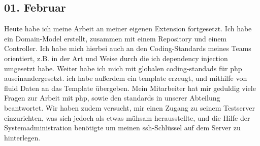 \subsection{01. Februar}
Heute habe ich meine Arbeit an meiner eigenen Extension fortgesetzt. Ich habe ein Domain-Model erstellt, zusammen mit einem Repository und einem Controller. Ich habe mich hierbei auch an den Coding-Standards meines Teams orientiert, z.B. in der Art und Weise durch die ich dependency injection umgesetzt habe. Weiter habe ich mich mit globalen coding-standads für php auseinandergesetzt. ich habe außerdem ein template erzeugt, und mithilfe von fluid Daten an das Template übergeben. Mein Mitarbeiter hat mir geduldig viele Fragen zur Arbeit mit php, sowie den standards in unserer Abteilung beantwortet. Wir haben zudem versucht, mir einen Zugang zu seinem Testserver einzurichten, was sich jedoch als etwas mühsam herausstellte, und die Hilfe der Systemadministration benötigte um meinen ssh-Schlüssel auf dem Server zu hinterlegen.